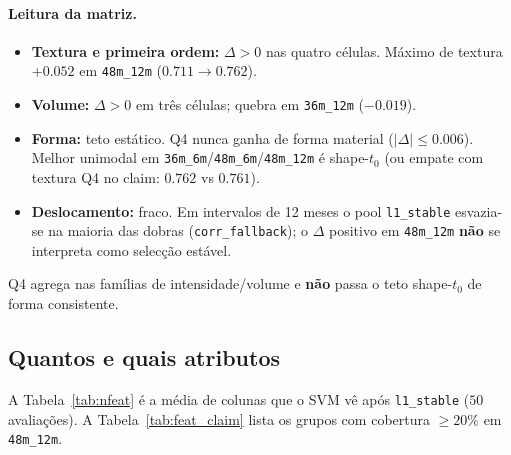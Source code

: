 \documentclass[review]{elsarticle}
\newcommand{\code}[1]{\texttt{#1}}
\begin{document}
\paragraph{Leitura da matriz.}
\begin{itemize}
\item \textbf{Textura e primeira ordem:} $\Delta>0$ nas quatro células. Máximo de textura $+0.052$ em \code{48m\_12m} ($0.711\to 0.762$).
\item \textbf{Volume:} $\Delta>0$ em três células; quebra em \code{36m\_12m} ($-0.019$).
\item \textbf{Forma:} teto estático. Q4 nunca ganha de forma material ($|\Delta|\le 0.006$). Melhor unimodal em \code{36m\_6m}/\code{48m\_6m}/\code{48m\_12m} é shape-$t_0$ (ou empate com textura Q4 no claim: $0.762$ vs $0.761$).
\item \textbf{Deslocamento:} fraco. Em intervalos de 12 meses o pool \code{l1\_stable} esvazia-se na maioria das dobras (\code{corr\_fallback}); o $\Delta$ positivo em \code{48m\_12m} \textbf{não} se interpreta como selecção estável.
\end{itemize}
Q4 agrega nas famílias de intensidade/volume e \textbf{não} passa o teto shape-$t_0$ de forma consistente.

\subsection{Quantos e quais atributos}
\label{subsec:atributos-sel}

A Tabela~\ref{tab:nfeat} é a média de colunas que o SVM vê após \code{l1\_stable} ($50$ avaliações).
A Tabela~\ref{tab:feat_claim} lista os grupos com cobertura $\ge 20\%$ em \code{48m\_12m}.
\end{document}
